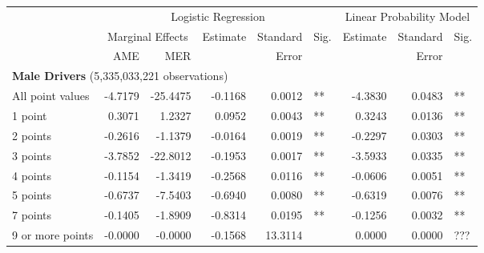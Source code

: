 
\begin{table}%
\centering 
\begin{tabular}{l r r r r l r r l} 

\hline 
 
 & \multicolumn{5}{c}{Logistic Regression}  & \multicolumn{3}{c}{Linear Probability Model} \\ 

 \cmidrule(lr){2-6}\cmidrule(lr){7-9} 
 & \multicolumn{2}{c}{Marginal Effects} & Estimate & Standard & Sig. & Estimate & Standard & Sig. \\ 

 \cmidrule(lr){2-3} 
 &   AME & MER &          &  Error   &      &          &  Error   &     \\ 

\hline 
 
\multicolumn{8}{l}{\textbf{Male Drivers} (5,335,033,221 observations)} \\ 

All point values                &  -4.7179        &  -25.4475       &  -0.1168        &  0.0012       &   **       &  -4.3830        &  0.0483       &   **       \\ 
1 point                         &  0.3071        &  1.2327       &  0.0952        &  0.0043       &   **       &  0.3243        &  0.0136       &   **       \\ 
2 points                        &  -0.2616        &  -1.1379       &  -0.0164        &  0.0019       &   **       &  -0.2297        &  0.0303       &   **       \\ 
3 points                        &  -3.7852        &  -22.8012       &  -0.1953        &  0.0017       &   **       &  -3.5933        &  0.0335       &   **       \\ 
4 points                        &  -0.1154        &  -1.3419       &  -0.2568        &  0.0116       &   **       &  -0.0606        &  0.0051       &   **       \\ 
5 points                        &  -0.6737        &  -7.5403       &  -0.6940        &  0.0080       &   **       &  -0.6319        &  0.0076       &   **       \\ 
7 points                        &  -0.1405        &  -1.8909       &  -0.8314        &  0.0195       &   **       &  -0.1256        &  0.0032       &   **       \\ 
9 or more points                &  -0.0000        &  -0.0000       &  -0.1568        &  13.3114       &            &  0.0000        &  0.0000       &  ???       \\ 


\end{tabular}
\end{table}
